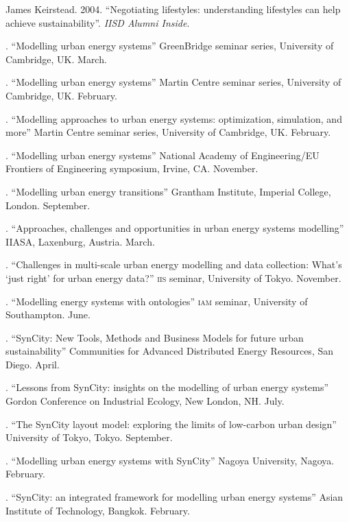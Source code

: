 \documentclass[11pt,a4paper]{article}
\begin{document}
\ind James Keirstead. 2004. ``Negotiating lifestyles: understanding lifestyles can help achieve sustainability''. \emph{IISD Alumni Inside}.

 \bigskip

\noindent{}%
%
. ``Modelling urban energy systems'' GreenBridge seminar series, University of Cambridge, UK. March.

. ``Modelling urban energy systems'' Martin Centre seminar series, University of Cambridge, UK. February.

. ``Modelling approaches to urban energy systems: optimization, simulation, and more'' Martin Centre seminar series, University of Cambridge, UK. February.

. ``Modelling urban energy systems'' National Academy of Engineering/EU Frontiers of Engineering symposium, Irvine, CA. November.

. ``Modelling urban energy transitions'' Grantham Institute, Imperial College, London. September.

. ``Approaches, challenges and opportunities in urban energy systems modelling'' IIASA, Laxenburg, Austria. March.

. ``Challenges in multi-scale urban energy modelling and data collection: What's `just right' for urban energy data?'' \textsc{iis} seminar, University of Tokyo. November.

. ``Modelling energy systems with ontologies'' \textsc{iam} seminar, University of Southampton. June.

. ``SynCity: New Tools, Methods and Business Models for future urban sustainability'' Communities for Advanced Distributed Energy Resources, San Diego.  April.

. ``Lessons from SynCity: insights on the modelling of urban energy systems'' Gordon Conference on Industrial Ecology, New London, NH.  July.

. ``The SynCity layout model: exploring the limits of low-carbon urban design'' University of Tokyo, Tokyo.  September.

. ``Modelling urban energy systems with SynCity'' Nagoya University, Nagoya. February.

. ``SynCity: an integrated framework for modelling urban energy systems'' Asian Institute of Technology, Bangkok. February.
\end{document}

